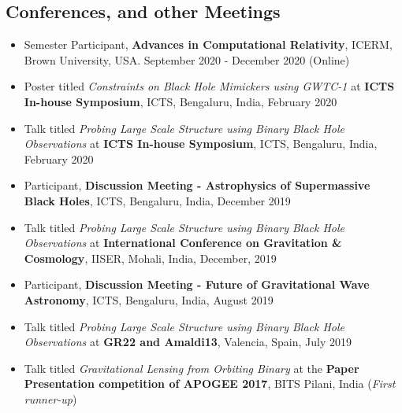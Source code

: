 \documentclass[margin, centered]{res}
\begin{document}
\begin{resume}
\section{Conferences, and other Meetings}
\begin{itemize}[leftmargin=*]
	\item Semester Participant, \textbf{Advances in Computational Relativity}, ICERM, Brown University, USA. September 2020 - December 2020 (Online)
	\item Poster titled \textit{Constraints on Black Hole Mimickers using GWTC-1} at \textbf{ICTS In-house Symposium}, ICTS, Bengaluru, India, February 2020
	\item Talk titled \textit{Probing Large Scale Structure using Binary Black Hole Observations} at \textbf{ICTS In-house Symposium}, ICTS, Bengaluru, India, February 2020
	\item	Participant, \textbf{Discussion Meeting - Astrophysics of Supermassive Black Holes}, ICTS, Bengaluru, India, December 2019
	\item Talk titled \textit{Probing Large Scale Structure using Binary Black Hole Observations} at \textbf{International Conference on Gravitation \& Cosmology}, IISER, Mohali, India, December, 2019
	\item Participant, \textbf{Discussion Meeting - Future of Gravitational Wave Astronomy}, ICTS, Bengaluru, India, August 2019

	\item Talk titled \textit{Probing Large Scale Structure using Binary Black Hole Observations} at \textbf{GR22 and Amaldi13}, Valencia, Spain, July 2019
	
	\item Talk titled \textit{Gravitational Lensing from Orbiting Binary} at the \textbf{Paper Presentation competition of APOGEE 2017}, BITS Pilani, India (\textit{First runner-up})
\end{itemize}

\end{resume}
\end{document}
